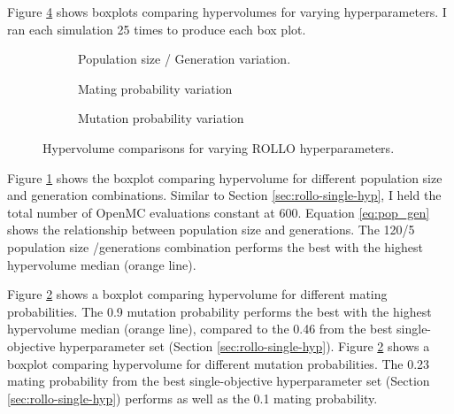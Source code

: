 Figure \ref{fig:hypervolume-comparison} shows boxplots comparing hypervolumes 
for varying hyperparameters. 
I ran each simulation 25 times to produce each box plot. 
\begin{figure}[htbp]
    \centering
    \begin{subfigure}{0.55\textwidth}
    \caption{Population size / Generation variation.}
    \label{fig:hypervolume-comparison-gens}
    \end{subfigure}
    \begin{subfigure}{0.55\textwidth}
        \caption{Mating probability variation}
        \label{fig:hypervolume-comparison-matpb}
    \end{subfigure}
    \begin{subfigure}{0.55\textwidth}
        \caption{Mutation probability variation}
        \label{fig:hypervolume-comparison-mutpb}
    \end{subfigure}
    \caption{Hypervolume comparisons for varying \acrfull{ROLLO} hyperparameters. }
    \label{fig:hypervolume-comparison}
\end{figure}
Figure \ref{fig:hypervolume-comparison-gens} shows the boxplot comparing hypervolume 
for different population size and generation combinations. 
Similar to Section \ref{sec:rollo-single-hyp}, I held the total number of OpenMC 
evaluations constant at 600. 
Equation \ref{eq:pop_gen} shows the relationship between population size and generations. 
The 120/5 population size /generations combination performs the best with the highest 
hypervolume median (orange line). 

Figure \ref{fig:hypervolume-comparison-matpb} shows a boxplot comparing hypervolume 
for different mating probabilities. 
The 0.9 mutation probability performs the best with the highest hypervolume median 
(orange line), compared to the 0.46 from the best single-objective hyperparameter set 
(Section \ref{sec:rollo-single-hyp}). 
Figure \ref{fig:hypervolume-comparison-matpb} shows a boxplot comparing hypervolume 
for different mutation probabilities. 
The 0.23 mating probability from the best single-objective hyperparameter set 
(Section \ref{sec:rollo-single-hyp}) performs as well as the 0.1 mating probability. 

